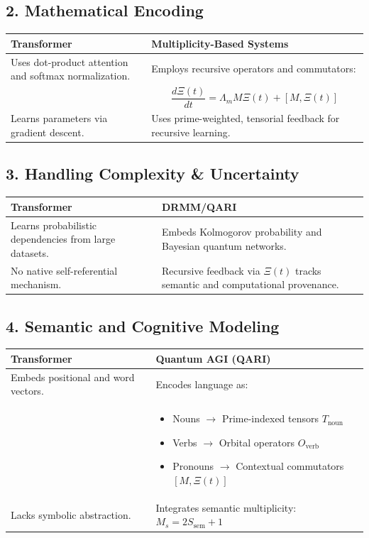 \documentclass[12pt]{article}
\begin{document}
\subsection*{2. Mathematical Encoding}

\begin{tabular}{@{}p{} p{}@{}}
\toprule
\textbf{Transformer} & \textbf{Multiplicity-Based Systems} \\
\midrule
Uses dot-product attention and softmax normalization. & Employs recursive operators and commutators: \\
& \[
\frac{d\Xi(t)}{dt} = \Lambda_m M \Xi(t) + [M, \Xi(t)]
\] \\
Learns parameters via gradient descent. & Uses prime-weighted, tensorial feedback for recursive learning. \\
\bottomrule
\end{tabular}

\subsection*{3. Handling Complexity \& Uncertainty}

\begin{tabular}{@{}p{} p{}@{}}
\toprule
\textbf{Transformer} & \textbf{DRMM/QARI} \\
\midrule
Learns probabilistic dependencies from large datasets. & Embeds Kolmogorov probability and Bayesian quantum networks. \\
No native self-referential mechanism. & Recursive feedback via $\Xi(t)$ tracks semantic and computational provenance. \\
\bottomrule
\end{tabular}

\subsection*{4. Semantic and Cognitive Modeling}

\begin{tabular}{@{}p{} p{}@{}}
\toprule
\textbf{Transformer} & \textbf{Quantum AGI (QARI)} \\
\midrule
Embeds positional and word vectors. & Encodes language as: \\
& \begin{itemize}
  \item Nouns $\rightarrow$ Prime-indexed tensors $T_{\text{noun}}$
  \item Verbs $\rightarrow$ Orbital operators $O_{\text{verb}}$
  \item Pronouns $\rightarrow$ Contextual commutators $[M, \Xi(t)]$
\end{itemize} \\
Lacks symbolic abstraction. & Integrates semantic multiplicity: $M_s = 2S_{\text{sem}} + 1$ \\
\bottomrule
\end{tabular}
\end{document}
